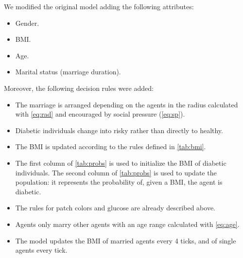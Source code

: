 We modified the original model adding the following attributes:
\begin{itemize}
\item Gender.
\item BMI.
\item Age.
\item Marital status (marriage duration).
\end{itemize}
Moreover, the following decision rules were added:
\begin{itemize}
\item  The marriage is arranged depending on the agents in the radius calculated with \cref{eq:rad} and encouraged by social pressure (\cref{eq:sp}). 
\item Diabetic individuals change into risky rather than directly to healthy.
\item The BMI is updated according to the rules defined in \cref{tab:bmi}.
\item  The first column of \cref{tab:probs} is used to initialize the BMI of diabetic individuals. The second column of \cref{tab:probs} is used to update the population: it represents the probability of, given a BMI, the agent is diabetic.
\item The rules for patch colors and glucose are already described above.
\item Agents only marry other agents with an age range calculated with \cref{eq:age}.
\item The model updates the BMI of married agents every 4 ticks, and of single agents every tick.
\end{itemize}
